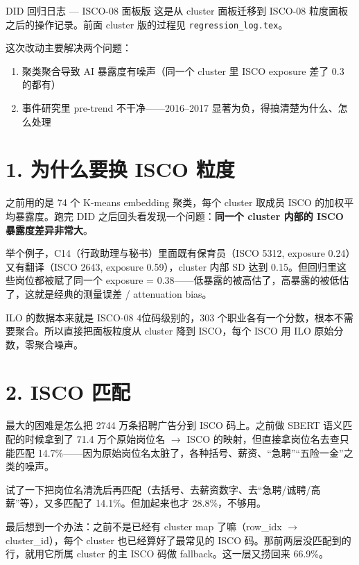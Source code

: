 \documentclass[12pt,a4paper]{article}
\begin{document}
\begin{chapterbox}{DID 回归日志 --- ISCO-08 面板版}
这是从 cluster 面板迁移到 ISCO-08 粒度面板之后的操作记录。前面 cluster 版的过程见 \texttt{regression\_log.tex}。

\medskip
这次改动主要解决两个问题：
\begin{enumerate}
  \item 聚类聚合导致 AI 暴露度有噪声（同一个 cluster 里 ISCO exposure 差了 0.3 的都有）
  \item 事件研究里 pre-trend 不干净——2016--2017 显著为负，得搞清楚为什么、怎么处理
\end{enumerate}
\end{chapterbox}

\bigskip

\section*{1. 为什么要换 ISCO 粒度}

之前用的是 74 个 K-means embedding 聚类，每个 cluster 取成员 ISCO 的加权平均暴露度。跑完 DID 之后回头看发现一个问题：\textbf{同一个 cluster 内部的 ISCO 暴露度差异非常大}。

举个例子，C14（行政助理与秘书）里面既有保育员（ISCO 5312, exposure 0.24）又有翻译（ISCO 2643, exposure 0.59），cluster 内部 SD 达到 0.15。但回归里这些岗位都被赋了同一个 exposure = 0.38——低暴露的被高估了，高暴露的被低估了，这就是经典的测量误差 / attenuation bias。

ILO 的数据本来就是 ISCO-08 4位码级别的，303 个职业各有一个分数，根本不需要聚合。所以直接把面板粒度从 cluster 降到 ISCO，每个 ISCO 用 ILO 原始分数，零聚合噪声。

\bigskip

\section*{2. ISCO 匹配}

最大的困难是怎么把 2744 万条招聘广告分到 ISCO 码上。之前做 SBERT 语义匹配的时候拿到了 71.4 万个原始岗位名 $\rightarrow$ ISCO 的映射，但直接拿岗位名去查只能匹配 14.7\%——因为原始岗位名太脏了，各种括号、薪资、“急聘”“五险一金”之类的噪声。

试了一下把岗位名清洗后再匹配（去括号、去薪资数字、去“急聘/诚聘/高薪”等），又多匹配了 14.1\%。但加起来也才 28.8\%，不够用。

最后想到一个办法：之前不是已经有 cluster map 了嘛（row\_idx $\rightarrow$ cluster\_id），每个 cluster 也已经算好了最常见的 ISCO 码。那前两层没匹配到的行，就用它所属 cluster 的主 ISCO 码做 fallback。这一层又捞回来 66.9\%。
\end{document}
